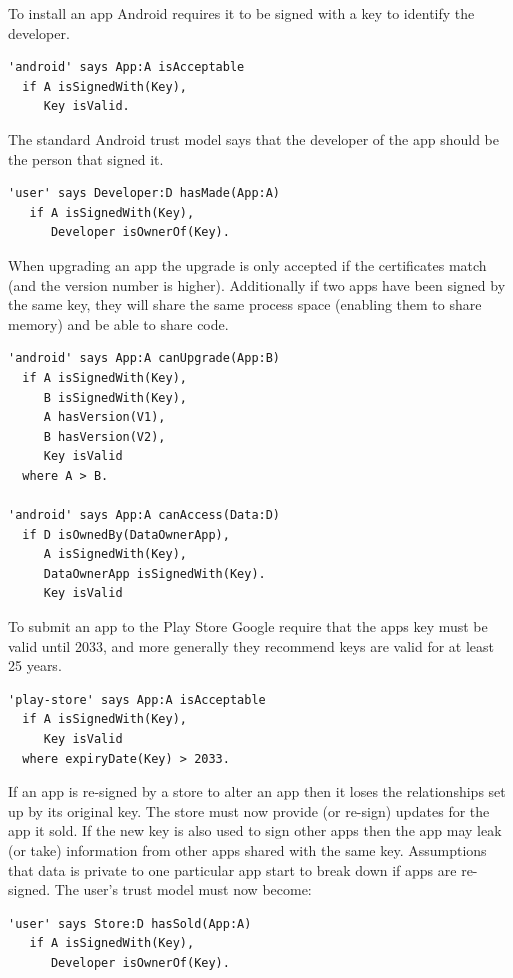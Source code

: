 \documentclass[thesis.tex]{subfiles}
\begin{document}
To install an app Android requires it to be signed with a key to
identify the developer.

\begin{lstlisting}
'android' says App:A isAcceptable
  if A isSignedWith(Key),
     Key isValid.
\end{lstlisting}

The standard Android trust model says that the developer of the app should be the person that signed it.

\begin{lstlisting}
'user' says Developer:D hasMade(App:A)
   if A isSignedWith(Key),
      Developer isOwnerOf(Key).
\end{lstlisting}

When upgrading an app the upgrade is only accepted if the certificates match
(and the version number is higher). Additionally if two apps have been signed by
the same key, they will share the same process space (enabling them to share
memory) and be able to share code.

\begin{lstlisting}
'android' says App:A canUpgrade(App:B)
  if A isSignedWith(Key),
     B isSignedWith(Key),
     A hasVersion(V1),
     B hasVersion(V2),
     Key isValid
  where A > B.
  
'android' says App:A canAccess(Data:D)
  if D isOwnedBy(DataOwnerApp),
     A isSignedWith(Key),
     DataOwnerApp isSignedWith(Key).
     Key isValid
\end{lstlisting}

To submit an app to the Play Store Google require that the apps key must be
valid until 2033, and more generally they recommend keys are valid for at least
25 years. 

\begin{lstlisting}
'play-store' says App:A isAcceptable
  if A isSignedWith(Key),
     Key isValid
  where expiryDate(Key) > 2033.
\end{lstlisting}

If an app is re-signed by a store to alter an app then it loses the
relationships set up by its original key. The store must now provide (or
re-sign) updates for the app it sold.
If the new key is also used to sign other apps then the app
may leak (or take) information from other apps shared with the same key.
Assumptions that data is private to one particular app start to break down if
apps are re-signed.  The user's trust model must now become:

\begin{lstlisting}
'user' says Store:D hasSold(App:A)
   if A isSignedWith(Key),
      Developer isOwnerOf(Key).
\end{lstlisting}
\end{document}
